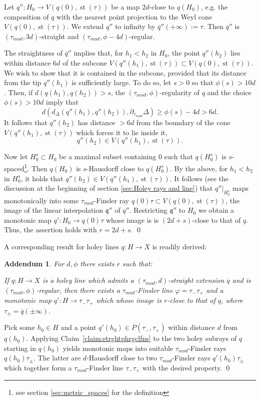\documentclass[12pt]{article}
\theoremstyle{boldplain}
\newtheorem{add}[equation]{Addendum}
\theoremstyle{bolddefinition}
\numberwithin{equation}{section}
\def\De{\Delta}
\def\Dt{\partial_{\tau_{mod}}}
\def\ol{\overline}
\def\st{\operatorname{st}}
\def\taumod{\tau_{mod}}
\def\mini{\scriptsize}
\begin{document}
Let $q'':H_0\to V(q(0),\st(\tau))$ be a map  $2d$-close to $q(H_0)$,
e.g. the {composition of $q$ with the} nearest point projection to the Weyl cone {$V(q(0),\st(\tau))$}.
We extend $q''$ to infinity by $\ol q''(+\infty):=\tau$.
Then $\ol q''$ is $(\taumod,3d)$-straight and $(\taumod,\phi-4d)$-regular.

The straightness of $\ol q''$ implies that, 
for $h_1<h_2$ in $H_0$,
the point $q''(h_2)$ lies within distance $6d$ of the subcone $V(q''(h_1),\st(\tau))\subset V(q(0),\st(\tau))$.
We wish to show that it is contained in the subcone, 
provided that its distance from the tip $q''(h_1)$ is sufficiently large.
To do so,
let $s>0$ so that $\phi(s)>10d$.
Then,
if $d(q(h_1),q(h_2))>s$, the $(\taumod,\phi)$-regularity of $q$ and the choice $\phi(s)>10d$ imply 
 that 
$$
d(d_{\De}(q''(h_1),q''(h_2)),\Dt\De)\geq\phi(s)-4d>6d.
$$
It follows that $q''(h_2)$ has distance $>6d$ from the boundary of the cone $V(q''(h_1),\st(\tau))$
which forces it to lie inside it,
$$q''(h_2)\in V(q''(h_1),\st(\tau)) .$$

Now let $H_0^s\subset H_0$ be a maximal subset containing $0$ such that $q(H_0^s)$ is $s$-spaced\footnote{see section \ref{sec:metric_spaces} for the definition}.
Then $q(H_0)$ is $s$-Hausdorff close to $q(H_0^s)$.
By the above,
for $h_1<h_2$ in $H_0^s$, it holds that $q''(h_2)\in V(q''(h_1),\st(\tau))$.
{It follows (see the discussion at the beginning of section \ref{sec:Holey rays and line}) 
 that $q''|_{H_0^s}$ maps monotonically into some $\taumod$-Finsler ray 
 $q(0)\tau\subset V(q(0),\st(\tau))$, the image of the linear interpolation ${\mathfrak q}''$ of $q''$.  
 Restricting ${\mathfrak q}''$ to $H_0$ we obtain 
 a monotonic map $q':H_0\to q(0)\tau$ whose image is is $(2d+s)$-close to that of $q$.}
Thus, the assertion holds with $r=2d+s$. 
\qed


\medskip
A corresponding result for holey lines $q:H\to X$ is readily derived:
\begin{add}
\label{add:strghtphrgclfns}
For $d,\phi$ there exists $r$ such that:

If $q:H\to X$ is a holey line
which admits a 
$(\taumod,d)$-straight extension $\ol q$
and is $(\taumod,\phi)$-regular, 
then there exists a $\taumod$-Finsler line {$\varphi=\tau_-\tau_+$} and a monotonic map $q':H\to \tau_-\tau_+$ {\mini which} {whose image 
 is $r$-close to that of $q$,}  where $\tau_{\pm}=\ol q(\pm\infty)$.
\end{add}
\proof
Pick some $h_0\in H$ and a point $q'(h_0)\in P(\tau_-,\tau_+)$ within distance $d$ from $q(h_0)$.
Applying Claim~\ref{claim:strghtphrgclfns} to the two holey subrays of $q$ starting in $q(h_0)$
yields monotonic maps into suitable $\taumod$-Finsler rays $q(h_0)\tau_{\pm}$.
The latter are $d$-Hausdorff close to two $\taumod$-Finsler rays $q'(h_0)\tau_{\pm}$ 
which together form a $\taumod$-Finsler line $\tau_-\tau_+$ with the desired property.
\qed
\end{document}
